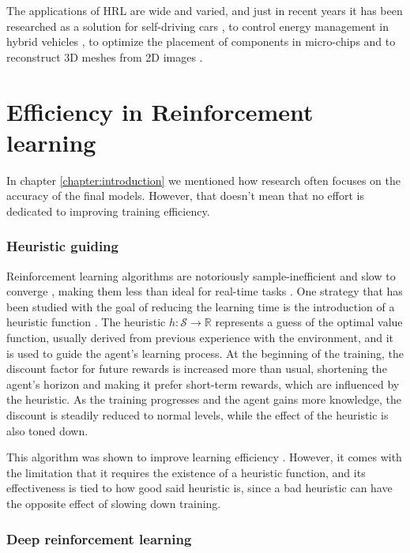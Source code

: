 The applications of HRL are wide and varied, and just in recent years it has been researched as a solution for self-driving cars \cite{Duan:2020}, to control energy management in hybrid vehicles \cite{Qi:2022}, to optimize the placement of components in micro-chips \cite{Tan:2024} and to reconstruct 3D meshes from 2D images \cite{Li:2023}.

\section{Efficiency in Reinforcement learning}

In chapter \ref{chapter:introduction} we mentioned how research often focuses on the accuracy of the final models. However, that doesn't mean that no effort is dedicated to improving training efficiency.

\subsubsection*{Heuristic guiding}

Reinforcement learning algorithms are notoriously sample-inefficient and slow to converge \cite{Botvinick:2019}, making them less than ideal for real-time tasks \cite{Bianchi:2004}. One strategy that has been studied with the goal of reducing the learning time is the introduction of a heuristic function \cite{Cheng:2021}. The heuristic $h:\mathcal{S}\to\mathbb{R}$ represents a guess of the optimal value function, usually derived from previous experience with the environment, and it is used to guide the agent's learning process. At the beginning of the training, the discount factor for future rewards is increased more than usual, shortening the agent's horizon and making it prefer short-term rewards, which are influenced by the heuristic. As the training progresses and the agent gains more knowledge, the discount is steadily reduced to normal levels, while the effect of the heuristic is also toned down.

This algorithm was shown to improve learning efficiency \cite{Cheng:2021}. However, it comes with the limitation that it requires the existence of a heuristic function, and its effectiveness is tied to how good said heuristic is, since a bad heuristic can have the opposite effect of slowing down training.

\subsubsection*{Deep reinforcement learning}

